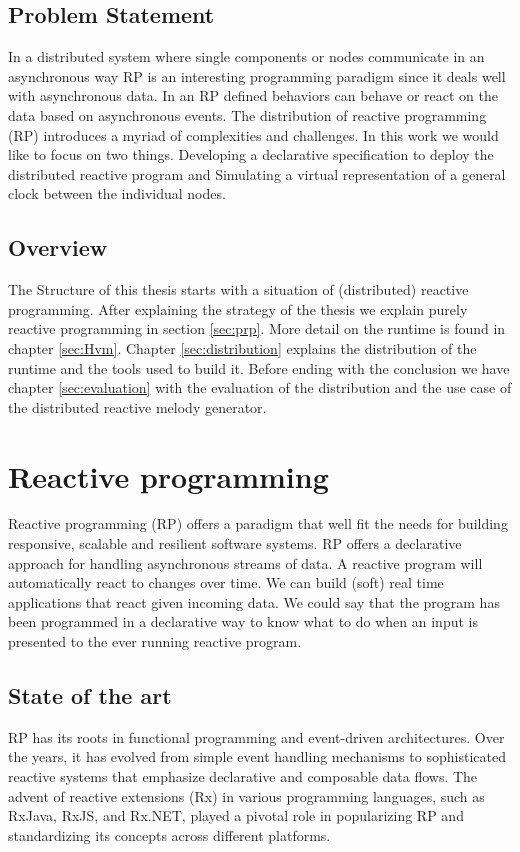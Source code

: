 \documentclass[a4paper]{book}
\begin{document}
\section{Problem Statement}
In a distributed system where single components or nodes communicate in an asynchronous way RP is an interesting programming paradigm since it deals well with asynchronous data. In an RP defined behaviors can behave or react on the data based on asynchronous events. The distribution of reactive programming (RP) introduces a myriad of complexities and challenges. In this work we would like to focus on two things. Developing a declarative specification to deploy the distributed reactive program and Simulating a virtual representation of a general clock between the individual nodes. 

\section{Overview}
The Structure of this thesis starts with a situation of (distributed) reactive programming. After explaining the strategy of the thesis we explain purely reactive programming in section \ref{sec:prp}. More detail on the runtime is found in chapter \ref{sec:Hvm}. Chapter \ref{sec:distribution} explains the distribution of the runtime and the tools used to build it. Before ending with the conclusion we have chapter \ref{sec:evaluation} with the evaluation of the distribution and the use case of the distributed reactive melody generator. 

\chapter{Reactive programming}

Reactive programming (RP) offers a paradigm that well fit the needs for building responsive, scalable and resilient software systems. RP offers a declarative approach for handling asynchronous streams of data. A reactive program will automatically react to changes over time. We can build (soft) real time applications that react given incoming data. We could say that the program has been programmed in a declarative way to know what to do when an input is presented to the ever running reactive program. 

\section{State of the art}
RP has its roots in functional programming and event-driven architectures. Over the years, it has evolved from simple event handling mechanisms to sophisticated reactive systems that emphasize declarative and composable data flows. The advent of reactive extensions (Rx) in various programming languages, such as RxJava, RxJS, and Rx.NET, played a pivotal role in popularizing RP and standardizing its concepts across different platforms.
\end{document}
